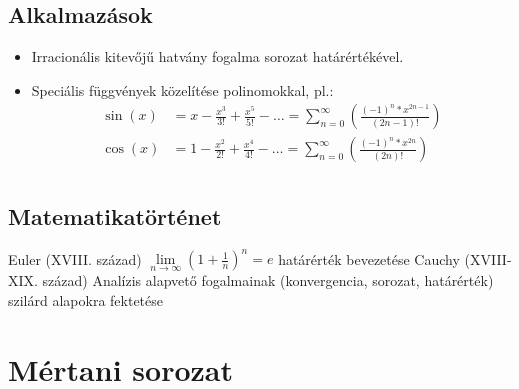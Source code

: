 \documentclass[twoside,12pt]{report}
\theoremstyle{definition}
\begin{document}
\section{Alkalmazások}
	\begin{itemize}
		\item Irracionális kitevőjű hatvány fogalma sorozat határértékével.
		\item Speciális függvények közelítése polinomokkal, pl.:
		\begin{align*}
			\sin(x)&=x-\frac{x^3}{3!}+\frac{x^5}{5!}-\dots=\sum_{n=0}^{\infty} \left(\frac{(-1)^n*x^{2n-1}}{(2n-1)!}\right)\\
			\cos(x)&=1-\frac{x^2}{2!}+\frac{x^4}{4!}-\dots=\sum_{n=0}^{\infty} \left(\frac{(-1)^n*x^{2n}}{(2n)!}\right)\\
		\end{align*}
	\end{itemize}
\section{Matematikatörténet}
	\begin{outline}
		\1 Euler (XVIII. század)
			\2 $\lim\limits_{n\to\infty} \left(1+\frac{1}{n}\right)^n=e$ határérték bevezetése
		\1 Cauchy (XVIII-XIX. század)
			\2 Analízis alapvető fogalmainak (konvergencia, sorozat, határérték) szilárd alapokra fektetése
	\end{outline}
\chapter{Mértani sorozat}
\end{document}
